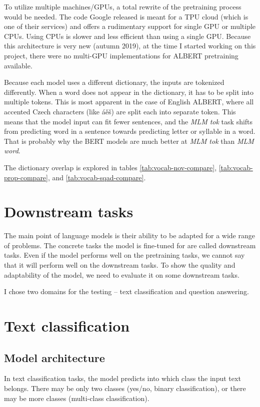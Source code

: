 \documentclass[
  printed, %
  color,   %
  table,   %
  oneside, %
  lof,     %
  lot,     %
]{fithesis3}
\begin{document}
To utilize multiple machines/GPUs, a total rewrite of the pretraining process would be needed. The code Google released is meant for a TPU cloud (which is one of their services) and offers a rudimentary support for single GPU or multiple CPUs. Using CPUs is slower and less efficient than using a single GPU. Because this architecture is very new (autumn 2019), at the time I started working on this project, there were no multi-GPU implementations for ALBERT pretraining available.

Because each model uses a different dictionary, the inputs are tokenized differently. When a word does not appear in the dictionary, it has to be split into multiple tokens. This is most apparent in the case of English ALBERT, where all accented Czech characters (like áěš) are split each into separate token. This means that the model input can fit fewer sentences, and the \textit{MLM tok} task shifts from predicting word in a sentence towards predicting letter or syllable in a word. That is probably why the BERT models are much better at \textit{MLM tok} than \textit{MLM word}.  


The dictionary overlap is explored in tables \ref{tab:vocab-nov-compare}, \ref{tab:vocab-prop-compare}, and \ref{tab:vocab-sqad-compare}.

\clearpage
\section{Downstream tasks}
The main point of language models is their ability to be adapted for a wide range of problems. The concrete tasks the model is fine-tuned for are called downstream tasks. Even if the model performs well on the pretraining tasks, we cannot say that it will perform well on the downstream tasks. To show the quality and adaptability of the model, we need to evaluate it on some downstream tasks.

I chose two domains for the testing -- text classification and question answering.

\section{Text classification}
\subsection{Model architecture}
In text classification tasks, the model predicts into which class the input text belongs. There may be only two classes (yes/no, binary classification), or there may be more classes (multi-class classification).
\end{document}
